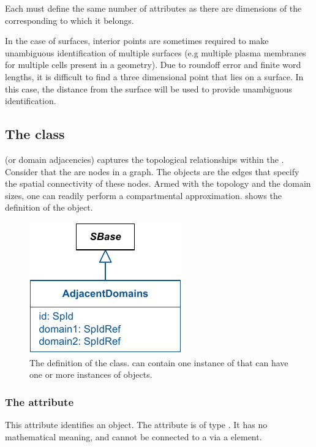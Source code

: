 Each \InteriorPoint must define the same number of attributes as there are dimensions of the corresponding \Geometry to which it belongs.

In the case of surfaces, interior points are sometimes required to make unambiguous identification of multiple surfaces (e.g multiple plasma membranes for multiple cells present in a geometry).  Due to roundoff error and finite word lengths, it is difficult to find a three dimensional point that lies on a surface.  In this case, the distance from the surface will be used to provide unambiguous identification.


\subsection{The  class}
\label{adjacentdomains-class}
\AdjacentDomains (or domain adjacencies) captures the topological relationships within the \Geometry.  Consider that the \Domains are nodes in a graph. The \AdjacentDomains objects are the edges that specify the spatial connectivity of these nodes.  Armed with the topology and the domain sizes, one can readily perform a compartmental approximation.   shows the definition of the \AdjacentDomains object.

\begin{figure}[ht]
  \includegraphics{figs/AdjacentDomains-uml}
  \caption{The definition of the \AdjacentDomains class. \Geometry can contain one instance of \ListOfAdjacentDomains that can have one or more instances of \AdjacentDomains objects.}
  \label{AdjacentDomains-uml}
\end{figure}

\subsubsection{The \fixttspace{} attribute}
This attribute identifies an \AdjacentDomains object. The attribute is of type .  It has no mathematical meaning, and cannot be connected to a \Parameter via a \SpatialSymbolReference element.

